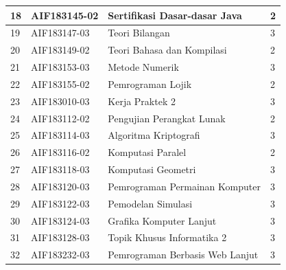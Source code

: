 \begin{table}[H]
\begin{tabular}{|p{0.5cm}|p{2.85cm}|p{4.95cm}|p{2.7cm}|}
18 & AIF183145-02 & Sertifikasi Dasar-dasar Java                 & 2 \\ \hline
19 & AIF183147-03 & Teori Bilangan                               & 3 \\ \hline
20 & AIF183149-02 & Teori Bahasa dan Kompilasi                   & 2 \\ \hline
21 & AIF183153-03 & Metode Numerik                               & 3 \\ \hline
22 & AIF183155-02 & Pemrograman Lojik                            & 2 \\ \hline
23 & AIF183010-03 & Kerja Praktek 2                              & 3 \\ \hline
24 & AIF183112-02 & Pengujian Perangkat Lunak                    & 2 \\ \hline
25 & AIF183114-03 & Algoritma Kriptografi                        & 3 \\ \hline
26 & AIF183116-02 & Komputasi Paralel                            & 2 \\ \hline
27 & AIF183118-03 & Komputasi Geometri                           & 3 \\ \hline
28 & AIF183120-03 & Pemrograman Permainan Komputer               & 3 \\ \hline
29 & AIF183122-03 & Pemodelan Simulasi                           & 3 \\ \hline
30 & AIF183124-03 & Grafika Komputer Lanjut                      & 3 \\ \hline
31 & AIF183128-03 & Topik Khusus Informatika 2                   & 3 \\ \hline
32 & AIF183232-03 & Pemrograman Berbasis Web Lanjut              & 3 \\ \hline
		\end{tabular}
	\label{tab:kuliahpilihan}
\end{table}

